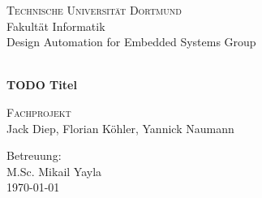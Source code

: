 \begin{titlepage}
	\begin{center}
		{\LARGE \textsc{Technische Universität Dortmund}} \\[4ex]
		{\Large Fakultät Informatik\\
		Design Automation for Embedded Systems Group \\}
	\end{center}
  \vspace*{8ex}
  \begin{center}
    {\Huge \textbf{~\\
    TODO Titel} \\}
  \end{center}
  \vspace*{8ex}
  \begin{center}
  	{\huge \textsc{Fachprojekt} \\[6ex] }
    {\Large Jack Diep, Florian Köhler, Yannick Naumann \\}
    \end{center}
    \vspace*{8ex}
	\begin{flushleft}
        {\large
		Betreuung: \\
		M.Sc. Mikail Yayla \\
		\vspace*{4ex}
		\today \\}
	\end{flushleft}	
\end{titlepage}
